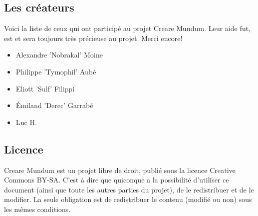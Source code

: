 \documentclass[a4paper]{article}
\begin{document}
\subsection{Les créateurs}
Voici la liste de ceux qui ont participé au projet Creare Mundum. Leur aide fut, est et sera toujours très précieuse au projet. Merci encore!  
\begin{itemize}
\item Alexandre ’Nobrakal’ Moine 
\item Philippe ’Tymophil’ Aubé 
\item Eliott ’Sulf’ Filippi
\item Émiland ’Derec’ Garrabé
\item Luc H.
\end{itemize}
\subsection{Licence}
Creare Mundum est un projet libre de droit, publié sous la licence Creative Commons BY-SA. C'est à dire que quiconque a la possibilité d'utiliser ce document (ainsi que toute les autres parties du projet), de le redistribuer et de le modifier. La seule obligation est de redistribuer le contenu (modifié ou non) sous les mêmes conditions.
\end{document}
